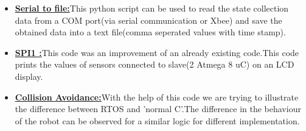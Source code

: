 \documentclass[a4paper,12pt,oneside]{book}
\begin{document}
\begin{itemize}
\newpage

\\
\item \textbf{\href{https://github.com/eYSIP-2016/RTOS_LPC2148/tree/master/serial_com}{Serial to file:}}This python script can be used to read the state collection data from a COM port(via serial communication or Xbee) and save the obtained data into a text file(comma seperated values with time stamp).
\\
\item \textbf{\href{https://github.com/eYSIP-2016/RTOS_LPC2148/tree/master/SPI_ADC}{SPI1 :}}This code was an improvement of an already existing code.This code prints the values of sensors connected to slave(2 Atmega 8 uC) on an LCD display.
\\
\item \textbf{\href{https://github.com/eYSIP-2016/RTOS_LPC2148/tree/master/Collision\%20avoidance}{Collision Avoidance:}}With the help of this code we are trying to illustrate the difference between RTOS and 'normal C'.The difference in the behaviour of the robot can be observed for a similar logic for different implementation.
\end{itemize}

\newpage


\end{document}
